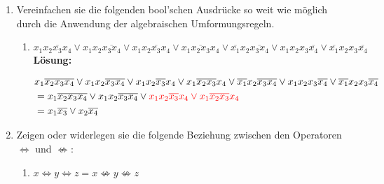 \documentclass[paper=a4,fontsize=11pt]{scrartcl}%
\numberwithin{equation}{section}
\newenvironment{solution}
	{
		\color{Blue}
		\textbf{Lösung:}
	}{}
\begin{document}
\begin{enumerate}
	\begin{solution}
	\begin{enumerate}
		\item Kommutativegesetz:
		\begin{align*}
		kgV(a,b) &= kgV(b,a)\\
		ggT(a,b) &= ggT(b,a)
		\end{align*}
		\item Distributivgesetz:
		\begin{align*}
		kgV(a, ggT(b,c)) &= ggT(kgV(a,b), kgV(a,c))\\
		ggT(a, kgV(b,c)) &= kgV(ggT(a,b), ggT(a,c))
		\end{align*}
		\item Neutrale Elemente:
		\begin{align*}
		kgV(a,1) &= a\\
		ggT(a,6) &= a
		\end{align*}
		\item Inverse Elemente: Das inverse Element von 1 ist 6 und das inverse Element von 2 ist 3.
		\begin{align*}
		kgV(1,6) &= 6\\
		kgV(2,3) &= 6\\
		ggT(1,6) &= 1\\
		ggT(2,3) &= 1\\
		\end{align*}
	\end{enumerate}
	\end{solution}
	\item Vereinfachen sie die folgenden bool'schen Ausdrücke so weit wie möglich durch die Anwendung der algebraischen Umformungsregeln.
	\begin{enumerate}
		\item $ x_1 \overline{x_2 x_3 x_4} \lor x_1 x_2 \overline{x_3 x_4} \lor x_1 x_2 \overline{x_3} x_4 \lor x_1 \overline{x_2 x_3} x_4 \lor \overline{x_1} x_2 \overline{x_3 x_4} \lor x_1 x_2 x_3 \overline{x_4} \lor \overline{x_1} x_2 x_3 \overline{x_4}$
		\begin{solution}
		\begin{align*}
		& x_1 \overline{x_2 x_3 x_4} \lor x_1 x_2 \overline{x_3 x_4} \lor x_1 x_2 \overline{x_3} x_4 \lor x_1 \overline{x_2 x_3} x_4 \lor \overline{x_1} x_2 \overline{x_3 x_4} \lor x_1 x_2 x_3 \overline{x_4} \lor \overline{x_1} x_2 x_3 \overline{x_4} \\
		&= x_1 \overline{x_2 x_3 x_4} \lor x_1 x_2 \overline{x_3 x_4} \lor \color{red}{x_1 x_2 \overline{x_3} x_4} \lor x_1 \overline{x_2} \overline{x_3} x_4\\
		&= x_1 \overline{x_3} \lor x_2 \overline{x_4}
		\end{align*}
		\end{solution}
	\end{enumerate}
	\item Zeigen oder widerlegen sie die folgende Beziehung zwischen den Operatoren $\Leftrightarrow$ und $\not\Leftrightarrow$:
	\begin{enumerate}
		\item $x \Leftrightarrow y \Leftrightarrow z = x \not\Leftrightarrow y \not\Leftrightarrow z$
		

\end{enumerate}
\end{enumerate}
\end{document}
